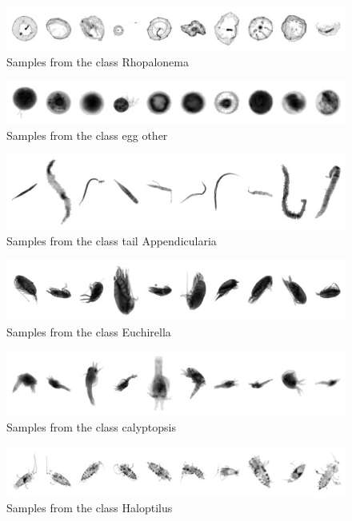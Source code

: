 \begin{figure}[h]
\includegraphics[width=\columnwidth]{collage/044_Rhopalonema.jpg}\caption{Samples from the class Rhopalonema }
\end{figure}
\begin{figure}[h]
\includegraphics[width=\columnwidth]{collage/045_egg__other.jpg}\caption{Samples from the class egg  other }
\end{figure}
\begin{figure}[h]
\includegraphics[width=\columnwidth]{collage/046_tail__Appendicularia.jpg}\caption{Samples from the class tail  Appendicularia }
\end{figure}
\begin{figure}[h]
\includegraphics[width=\columnwidth]{collage/047_Euchirella.jpg}\caption{Samples from the class Euchirella }
\end{figure}
\begin{figure}[h]
\includegraphics[width=\columnwidth]{collage/048_calyptopsis.jpg}\caption{Samples from the class calyptopsis }
\end{figure}
\begin{figure}[h]
\includegraphics[width=\columnwidth]{collage/049_Haloptilus.jpg}\caption{Samples from the class Haloptilus }
\end{figure}
